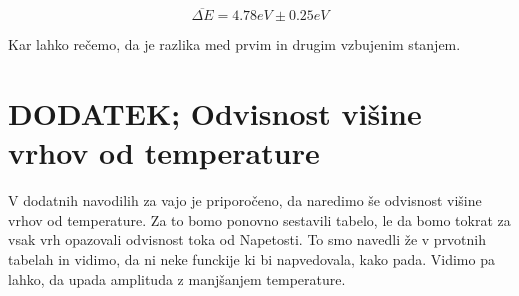 \documentclass[11pt, a4paper]{article}
\theoremstyle{definition}
\theoremstyle{example}
\theoremstyle{izrek}
\begin{document}
$$\overline{\Delta E}=4.78 eV \pm 0.25 eV$$

Kar lahko rečemo, da je razlika med prvim in drugim vzbujenim stanjem. 

\section{DODATEK; Odvisnost višine vrhov od temperature}
V dodatnih navodilih za vajo je priporočeno, da naredimo še odvisnost višine vrhov od temperature. Za to bomo ponovno sestavili tabelo, le da bomo tokrat za vsak vrh opazovali odvisnost toka od Napetosti. To smo navedli že v prvotnih tabelah in vidimo, da ni neke funckije ki bi napvedovala, kako pada. Vidimo pa lahko, da upada amplituda z manjšanjem temperature.
\end{document}
